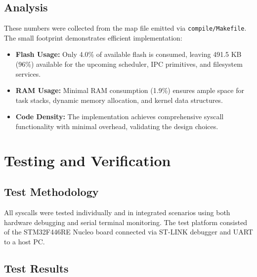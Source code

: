 \documentclass[11pt,a4paper]{article}
\begin{document}
\subsection{Analysis}
These numbers were collected from the map file emitted via \texttt{compile/Makefile}. The small footprint demonstrates efficient implementation:

\begin{itemize}[leftmargin=1.5em]
  \item \textbf{Flash Usage:} Only 4.0\% of available flash is consumed, leaving 491.5 KB (96\%) available for the upcoming scheduler, IPC primitives, and filesystem services.
  \item \textbf{RAM Usage:} Minimal RAM consumption (1.9\%) ensures ample space for task stacks, dynamic memory allocation, and kernel data structures.
  \item \textbf{Code Density:} The implementation achieves comprehensive syscall functionality with minimal overhead, validating the design choices.
\end{itemize}

\section{Testing and Verification}

\subsection{Test Methodology}
All syscalls were tested individually and in integrated scenarios using both hardware debugging and serial terminal monitoring. The test platform consisted of the STM32F446RE Nucleo board connected via ST-LINK debugger and UART to a host PC.

\subsection{Test Results}
\end{document}
